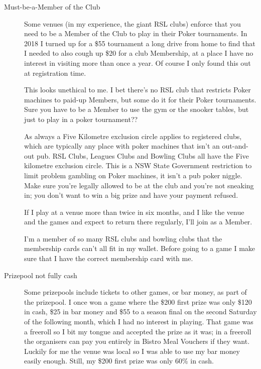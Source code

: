 \begin{description}
\item[Must-be-a-Member of the Club] Some venues (in my experience,
the giant RSL clubs) enforce that you need to be a Member of the Club
to play in their Poker tournaments. In 2018 I turned up for a \$55
tournament a long drive from home to find that I needed to also cough
up \$20 for a club Membership, at a place I have no interest in visiting
more than once a year. Of course I only found this out at registration
time.

This looks unethical to me. I bet there's no RSL club that
restricts Poker machines to paid-up Members, but some do it for
their Poker tournaments. Sure you have to be a Member to use
the gym or the snooker tables, but just to play in a poker
tournament??


As always a Five Kilometre exclusion circle applies to registered
clubs, which are typically any place with poker machines that isn't an
out-and-out pub. RSL Clubs, Leagues Clubs and Bowling Clubs all have
the Five kilometre exclusion circle. This is a NSW State Government
restriction to limit problem gambling on Poker machines, it isn't a
pub poker niggle. Make sure you're legally allowed to be at the club
and you're not sneaking in; you don't want to win a big prize and have
your payment refused.

If I play at a venue more than twice in six months, and I like the
venue and the games and expect to return there regularly, I'll join as
a Member.

I'm a member of so many RSL clubs and bowling clubs that the
membership cards can't all fit in my wallet. Before going to a game I
make sure that I have the correct membership card with me.

\item[Prizepool not fully cash] Some prizepools include tickets
to other games, or bar money, as part of the prizepool. I once won a game
where the \$200 first prize was only \$120 in cash, \$25 in bar money
and \$55 to a season final on the second Saturday of the following month,
which I had no interest in playing. That game was a freeroll so I bit
my tongue and accepted the prize as it was; in a freeroll the organisers
can pay you entirely in Bistro Meal Vouchers if they want. Luckily for
me the venue was local so I was able to use my bar money easily
enough. Still, my \$200 first prize was only 60\% in cash.


\end{description}
